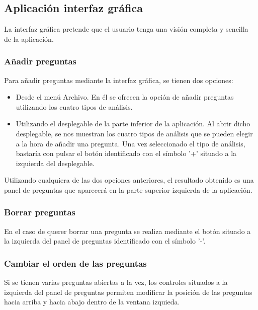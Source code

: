 \subsection{Aplicación interfaz gráfica}
La interfaz gráfica pretende que el usuario tenga una visión completa y sencilla de la aplicación.
\newpage
\subsubsection{Añadir preguntas}
Para añadir preguntas mediante la interfaz gráfica, se tienen dos opciones:

\begin{itemize}
\item Desde el menú Archivo. En él se ofrecen la opción de añadir preguntas utilizando los cuatro tipos de análisis.
\item Utilizando el desplegable de la parte inferior de la aplicación. Al abrir dicho desplegable, se nos muestran los cuatro tipos de análisis que se pueden elegir a la hora de añadir una pregunta. Una vez seleccionado el tipo de análisis, bastaría con pulsar el botón identificado con el símbolo '+' situado a la izquierda del desplegable.
\end{itemize}

Utilizando cualquiera de las dos opciones anteriores, el resultado obtenido es una panel de preguntas que aparecerá en la parte superior izquierda de la aplicación.

\subsubsection{Borrar preguntas}
En el caso de querer borrar una pregunta se realiza mediante el botón situado a la izquierda del panel de preguntas identificado con el símbolo '-'.

\subsubsection{Cambiar el orden de las preguntas}
Si se tienen varias preguntas abiertas a la vez, los controles situados a la izquierda del panel de preguntas permiten modificar la posición de las preguntas hacia arriba y hacia abajo dentro de la ventana izquieda.

